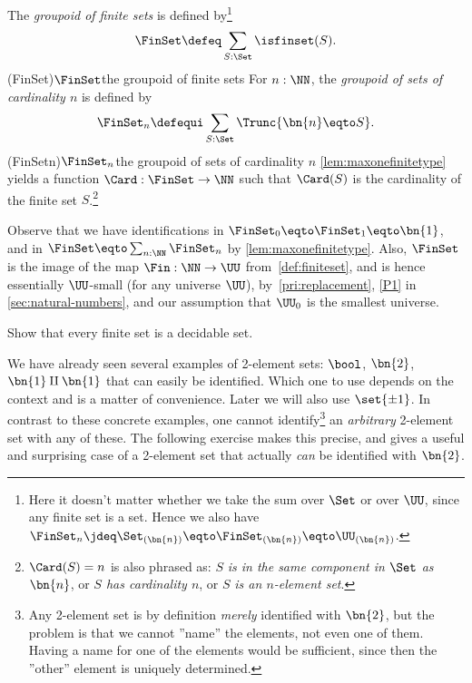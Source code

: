 
\begin{definition}\label{def:groupoidFin}
The \emph{groupoid of finite sets} is defined by\footnote{%
  Here it doesn't matter whether we take the 
  sum over $\Set$ or over $\UU$, since any finite set is a set.
  Hence we also have $\FinSet_n
  \jdeq \Set_{(\bn{n})} \eqto \FinSet_{(\bn{n})}
 \eqto \UU_{(\bn{n})}$.}
\[
  \FinSet\defeq\sum_{S:\Set}\isfinset(S).
\]
\glossary(FinSet){$\protect\FinSet$}{the groupoid of finite sets}
For $n:\NN$, the \emph{groupoid of sets of cardinality $n$} is defined by
\[
  \FinSet_n\defequi \sum_{S:\Set}\Trunc{\bn{n}\eqto S}.
\]
\glossary(FinSetn){$\protect\FinSet_n$}{the groupoid of sets of cardinality $n$}
\cref{lem:maxonefinitetype} yields a function $\Card:\FinSet\to\NN$
such that $\Card(S)$ is the cardinality of the finite set $S$.\footnote{%
$\Card(S)=n$ is also phrased as: $S$ \emph{is in the same component in $\Set$
as} $\bn{n}$, or \emph{$S$ has cardinality $n$},
or $S$ \emph{is an $n$-element set}.}
\end{definition}

Observe that we have identifications in
$\FinSet_0 \eqto \FinSet_1 \eqto \bn{1} $, and in
$\FinSet \eqto \sum_{n:\NN}\FinSet_n$ by \cref{lem:maxonefinitetype}.
Also, $\FinSet$ is the image of the map $\Fin : \NN \to \UU$
from~\cref{def:finiteset}, and is hence essentially $\UU$-small
(for any universe $\UU$), by~\cref{pri:replacement}, \cref{P1} in
\cref{sec:natural-numbers}, and our assumption
that $\UU_0$ is the smallest universe.

\begin{xca}\label{xca:finsets-decidable}
Show that every finite set is a decidable set.
\end{xca}

We have already seen several examples of 2-element sets:
$\bool$, $\bn{2}$, $\bn{1}\amalg\bn{1}$ that can easily
be identified. Which one to use
depends on the context and is a matter of convenience.
Later we will also use $\set{\pm1}$. In contrast
to these concrete examples, one cannot identify\footnote{%
Any 2-element set is by definition \emph{merely} identified
with $\bn{2}$, but the problem is that we cannot ''name''
the elements, not even one of them. Having a name for one
of the elements would be sufficient, since then the ''other''
element is uniquely determined.}
an \emph{arbitrary} 2-element set with any of these.
The following exercise makes this precise, and gives a
useful and surprising case of a 2-element set
that actually \emph{can} be identified with $\bn{2}$.

